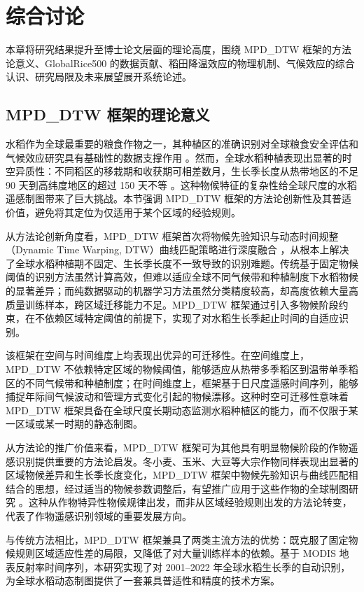 \chapter{综合讨论}

本章将研究结果提升至博士论文层面的理论高度，围绕 MPD\_DTW 框架的方法论意义、GlobalRice500 的数据贡献、稻田降温效应的物理机制、气候效应的综合认识、研究局限及未来展望展开系统论述。

\section{MPD\_DTW 框架的理论意义}

水稻作为全球最重要的粮食作物之一，其种植区的准确识别对全球粮食安全评估和气候效应研究具有基础性的数据支撑作用 \cite{Dong2016}。然而，全球水稻种植表现出显著的时空异质性：不同稻区的移栽期和收获期可相差数月，生长季长度从热带地区的不足 90 天到高纬度地区的超过 150 天不等 \cite{Xiao2006}。这种物候特征的复杂性给全球尺度的水稻遥感制图带来了巨大挑战。本节强调 MPD\_DTW 框架的方法论创新性及其普适价值，避免将其定位为仅适用于某个区域的经验规则。

从方法论创新角度看，MPD\_DTW 框架首次将物候先验知识与动态时间规整（Dynamic Time Warping, DTW）曲线匹配策略进行深度融合 \cite{Maus2016, Belgiu2018}，从根本上解决了全球水稻种植期不固定、生长季长度不一致导致的识别难题。传统基于固定物候阈值的识别方法虽然计算高效，但难以适应全球不同气候带和种植制度下水稻物候的显著差异；而纯数据驱动的机器学习方法虽然分类精度较高，却高度依赖大量高质量训练样本，跨区域迁移能力不足。MPD\_DTW 框架通过引入多物候阶段约束，在不依赖区域特定阈值的前提下，实现了对水稻生长季起止时间的自适应识别。

该框架在空间与时间维度上均表现出优异的可迁移性。在空间维度上，MPD\_DTW 不依赖特定区域的物候阈值，能够适应从热带多季稻区到温带单季稻区的不同气候带和种植制度；在时间维度上，框架基于日尺度遥感时间序列，能够捕捉年际间气候波动和管理方式变化引起的物候漂移。这种时空可迁移性意味着 MPD\_DTW 框架具备在全球尺度长期动态监测水稻种植区的能力，而不仅限于某一区域或某一时期的静态制图。

从方法论的推广价值来看，MPD\_DTW 框架可为其他具有明显物候阶段的作物遥感识别提供重要的方法论启发。冬小麦、玉米、大豆等大宗作物同样表现出显著的区域物候差异和生长季长度变化，MPD\_DTW 框架中物候先验知识与曲线匹配相结合的思想，经过适当的物候参数调整后，有望推广应用于这些作物的全球制图研究 \cite{Massey2017}。这种从作物特异性物候规律出发，而非从区域经验规则出发的方法论转变，代表了作物遥感识别领域的重要发展方向。

与传统方法相比，MPD\_DTW 框架兼具了两类主流方法的优势：既克服了固定物候规则区域适应性差的局限，又降低了对大量训练样本的依赖。基于 MODIS 地表反射率时间序列，本研究实现了对 2001--2022 年全球水稻生长季的自动识别，为全球水稻动态制图提供了一套兼具普适性和精度的技术方案。

